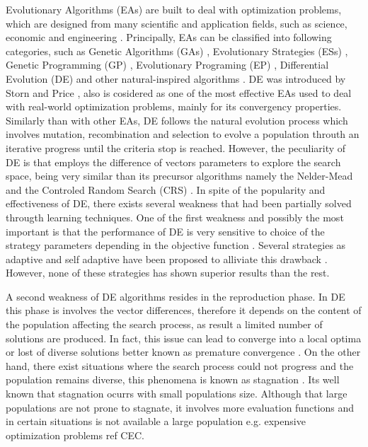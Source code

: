 Evolutionary Algorithms (EAs) are built to deal with optimization problems, which are designed from many scientific and application fields, such as science, economic and engineering \cite{noman2008differential, chakraborty2008advances}.
%
Principally, EAs can be classified into following categories, such as Genetic Algorithms (GAs) \cite{srinivas1994genetic, schwefel1977numerische} , Evolutionary Strategies (ESs) \cite{john1992holland}, Genetic Programming (GP) \cite{koza1992genetic}, Evolutionary Programing (EP) \cite{fogel1991meta}, Differential Evolution (DE) \cite{storn1997differential} and other natural-inspired algorithms \cite{das2011differential}.
%
%
DE was introduced by Storn and Price \cite{storn1997differential}, also is cosidered as one of the most effective EAs used to deal with real-world optimization problems, mainly for its convergency properties.
%
Similarly than with other EAs, DE follows the natural evolution process which involves mutation, recombination and selection to evolve a population throuth an iterative progress until the criteria stop is reached.
%
However, the peculiarity of DE is that employs the difference of vectors parameters to explore the search space, being very similar than its precursor algorithms namely the Nelder-Mead \cite{nelder1965simplex} and the Controled Random Search (CRS) \cite{price1983global}.
%
In spite of the popularity and effectiveness of DE, there exists several weakness that had been partially solved througth learning techniques.
%
One of the first weakness and possibly the most important is that the performance of DE is very sensitive to choice of the strategy parameters depending in the objective function \cite{gamperle2002parameter}.
%
Several strategies as adaptive and self adaptive have been proposed to alliviate this drawback \cite{brest2006self, zhang2009jade}.
%
However, none of these strategies has shown superior results than the rest.
%

A second weakness of DE algorithms resides in the reproduction phase.
%
In DE this phase is involves the vector differences, therefore it depends on the content of the population affecting the search process, as result a limited number of solutions are produced.
%
In fact, this issue can lead to converge into a local optima or lost of diverse solutions better known as premature convergence \cite{sa2008exploration}.
%
On the other hand, there exist situations where the search process could not progress and the population remains diverse, this phenomena is known as stagnation \cite{lampinen2000stagnation}.
%
Its well known that stagnation ocurrs with small populations size.
%
Although that large populations are not prone to stagnate, it involves more evaluation functions and in certain situations is not available a large population e.g. expensive optimization problems ref CEC.

